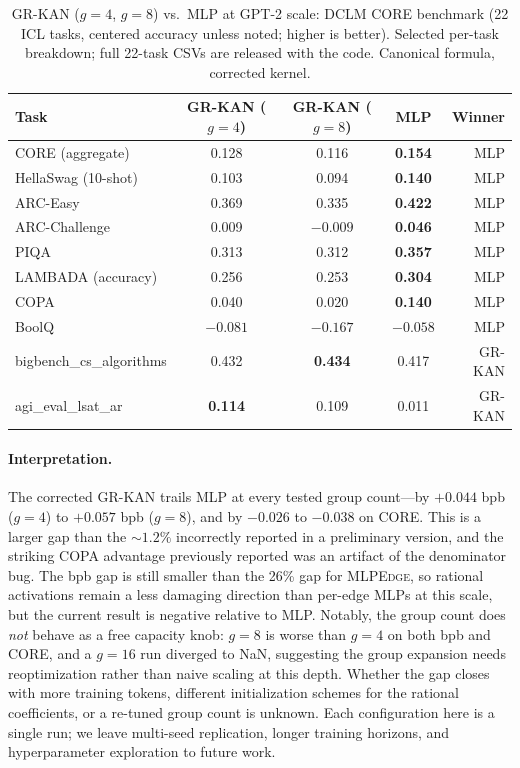 \documentclass{article}
\newcommand{\mlpedge}{\textsc{MLPEdge}}
\newcommand{\grkan}{\textsc{GR-KAN}}
\begin{document}
\begin{table}[h]
\centering
\caption{%
  \grkan{} ($g=4$, $g=8$) vs.\ MLP at GPT-2 scale: DCLM CORE benchmark
  (22 ICL tasks, centered accuracy unless noted; higher is better).
  Selected per-task breakdown; full 22-task CSVs are released with the code.
  Canonical formula, corrected kernel.
}
\label{tab:grkan_core}
\begin{tabular}{lcccr}
\toprule
Task & \grkan{} ($g=4$) & \grkan{} ($g=8$) & MLP & Winner \\
\midrule
CORE (aggregate) & 0.128 & 0.116 & \textbf{0.154} & MLP \\
\midrule
HellaSwag (10-shot) & 0.103 & 0.094 & \textbf{0.140} & MLP \\
ARC-Easy & 0.369 & 0.335 & \textbf{0.422} & MLP \\
ARC-Challenge & 0.009 & $-0.009$ & \textbf{0.046} & MLP \\
PIQA & 0.313 & 0.312 & \textbf{0.357} & MLP \\
LAMBADA (accuracy) & 0.256 & 0.253 & \textbf{0.304} & MLP \\
COPA & 0.040 & 0.020 & \textbf{0.140} & MLP \\
BoolQ & $-0.081$ & $-0.167$ & \textbf{$-0.058$} & MLP \\
\midrule
bigbench\_cs\_algorithms & 0.432 & \textbf{0.434} & 0.417 & \grkan{} \\
agi\_eval\_lsat\_ar & \textbf{0.114} & 0.109 & 0.011 & \grkan{} \\
\bottomrule
\end{tabular}
\end{table}

\paragraph{Interpretation.}
The corrected \grkan{} trails MLP at every tested group count---by $+0.044$ bpb
($g=4$) to $+0.057$ bpb ($g=8$), and by $-0.026$ to $-0.038$ on CORE.
This is a larger gap than the $\sim1.2\%$ incorrectly reported in a preliminary
version, and the striking COPA advantage previously reported was an artifact of
the denominator bug.
The bpb gap is still smaller than the 26\% gap for \mlpedge{}, so rational
activations remain a less damaging direction than per-edge MLPs at this scale, but
the current result is negative relative to MLP.
Notably, the group count does \emph{not} behave as a free capacity knob: $g=8$ is
worse than $g=4$ on both bpb and CORE, and a $g=16$ run diverged to NaN, suggesting
the group expansion needs reoptimization rather than naive scaling at this depth.
Whether the gap closes with more training tokens, different initialization schemes
for the rational coefficients, or a re-tuned group count is unknown.
Each configuration here is a single run; we leave multi-seed replication, longer
training horizons, and hyperparameter exploration to future work.
\end{document}

